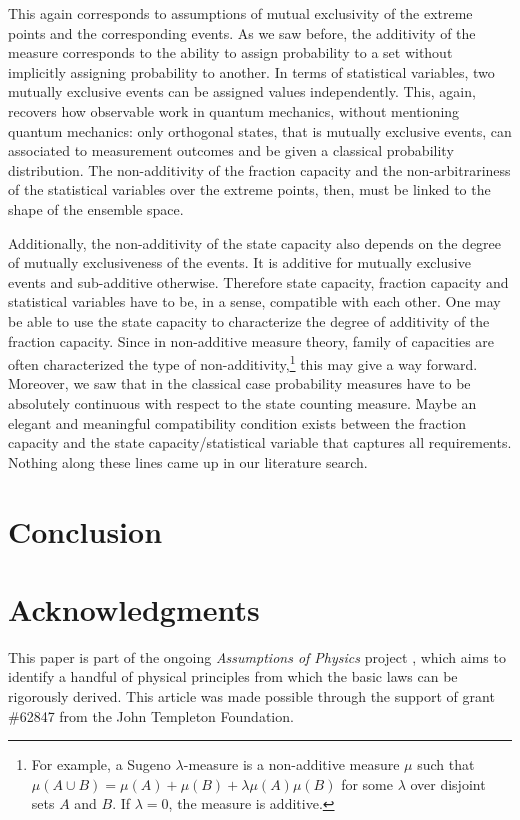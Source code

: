 \documentclass[10pt,twocolumn, nofootinbib]{revtex4-2}
\begin{document}
This again corresponds to assumptions of mutual exclusivity of the extreme points and the corresponding events. As we saw before, the additivity of the measure corresponds to the ability to assign probability to a set without implicitly assigning probability to another. In terms of statistical variables, two mutually exclusive events can be assigned values independently. This, again, recovers how observable work in quantum mechanics, without mentioning quantum mechanics: only orthogonal states, that is mutually exclusive events, can associated to measurement outcomes and be given a classical probability distribution. The non-additivity of the fraction capacity and the non-arbitrariness of the statistical variables over the extreme points, then, must be linked to the shape of the ensemble space.

Additionally, the non-additivity of the state capacity also depends on the degree of mutually exclusiveness of the events. It is additive for mutually exclusive events and sub-additive otherwise. Therefore state capacity, fraction capacity and statistical variables have to be, in a sense, compatible with each other. One may be able to use the state capacity to characterize the degree of additivity of the fraction capacity. Since in non-additive measure theory, family of capacities are often characterized the type of non-additivity,\footnote{For example, a Sugeno $\lambda$-measure is a non-additive measure $\mu$ such that $\mu(A \cup B) = \mu(A) + \mu(B) + \lambda \mu(A)\mu(B)$ for some $\lambda$ over disjoint sets $A$ and $B$. If $\lambda = 0$, the measure is additive.} this may give a way forward. Moreover, we saw that in the classical case probability measures have to be absolutely continuous with respect to the state counting measure. Maybe an elegant and meaningful compatibility condition exists between the fraction capacity and the state capacity/statistical variable that captures all requirements. Nothing along these lines came up in our literature search.


\section{Conclusion}



\section*{Acknowledgments}
This paper is part of the ongoing \textit{Assumptions of Physics} project \cite{aop-book}, which aims to identify a handful of physical principles from which the basic laws can be rigorously derived. This article was made possible through the support of grant \#62847 from the John Templeton Foundation.




\newcommand{\pj}[1] {\underbar{$#1$}}
\end{document}
